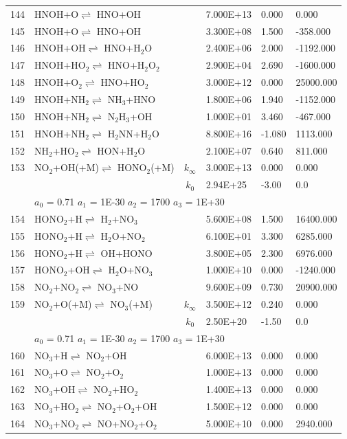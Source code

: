 \documentclass[11pt]{article}
\begin{document}
\begin{table}[hbt]
\begin{tabular}{|r l c l l l|}
144 &	HNOH+O$\rightleftharpoons$ HNO+OH&	&	7.000E+13&	0.000&	0.000\\ 
145 &	HNOH+O$\rightleftharpoons$ HNO+OH&	&	3.300E+08&	1.500&	-358.000\\ 
146 &	HNOH+OH$\rightleftharpoons$ HNO+H$_{2}$O&	&	2.400E+06&	2.000&	-1192.000\\ 
147 &	HNOH+HO$_{2}$$\rightleftharpoons$ HNO+H$_{2}$O$_{2}$&	&	2.900E+04&	2.690&	-1600.000\\ 
148 &	HNOH+O$_{2}$$\rightleftharpoons$ HNO+HO$_{2}$&	&	3.000E+12&	0.000&	25000.000\\ 
149 &	HNOH+NH$_{2}$$\rightleftharpoons$ NH$_{3}$+HNO&	&	1.800E+06&	1.940&	-1152.000\\ 
150 &	HNOH+NH$_{2}$$\rightleftharpoons$ N$_{2}$H$_{3}$+OH&	&	1.000E+01&	3.460&	-467.000\\ 
151 &	HNOH+NH$_{2}$$\rightleftharpoons$ H$_{2}$NN+H$_{2}$O&	&	8.800E+16&	-1.080&	1113.000\\ 
152 &	NH$_{2}$+HO$_{2}$$\rightleftharpoons$ HON+H$_{2}$O&	&	2.100E+07&	0.640&	811.000\\ 
153 &	NO$_{2}$+OH(+M)$\rightleftharpoons$ HONO$_{2}$(+M)&	$k_{\infty}$&	3.000E+13&	0.000&	0.000\\ 
	&	&	$k_0$&	2.94E+25&-3.00&	    0.0\\ 
	&\multicolumn{5}{l|}{	$a_0$ = 0.71	$a_1$ = 1E-30	$a_2$ = 1700	$a_3$ = 1E+30}\\ 
154 &	HONO$_{2}$+H$\rightleftharpoons$ H$_{2}$+NO$_{3}$&	&	5.600E+08&	1.500&	16400.000\\ 
155 &	HONO$_{2}$+H$\rightleftharpoons$ H$_{2}$O+NO$_{2}$&	&	6.100E+01&	3.300&	6285.000\\ 
156 &	HONO$_{2}$+H$\rightleftharpoons$ OH+HONO&	&	3.800E+05&	2.300&	6976.000\\ 
157 &	HONO$_{2}$+OH$\rightleftharpoons$ H$_{2}$O+NO$_{3}$&	&	1.000E+10&	0.000&	-1240.000\\ 
158 &	NO$_{2}$+NO$_{2}$$\rightleftharpoons$ NO$_{3}$+NO&	&	9.600E+09&	0.730&	20900.000\\ 
159 &	NO$_{2}$+O(+M)$\rightleftharpoons$ NO$_{3}$(+M)&	$k_{\infty}$&	3.500E+12&	0.240&	0.000\\ 
	&	&	$k_0$&	2.50E+20&-1.50&	    0.0\\ 
	&\multicolumn{5}{l|}{	$a_0$ = 0.71	$a_1$ = 1E-30	$a_2$ = 1700	$a_3$ = 1E+30}\\ 
160 &	NO$_{3}$+H$\rightleftharpoons$ NO$_{2}$+OH&	&	6.000E+13&	0.000&	0.000\\ 
161 &	NO$_{3}$+O$\rightleftharpoons$ NO$_{2}$+O$_{2}$&	&	1.000E+13&	0.000&	0.000\\ 
162 &	NO$_{3}$+OH$\rightleftharpoons$ NO$_{2}$+HO$_{2}$&	&	1.400E+13&	0.000&	0.000\\ 
163 &	NO$_{3}$+HO$_{2}$$\rightleftharpoons$ NO$_{2}$+O$_{2}$+OH&	&	1.500E+12&	0.000&	0.000\\ 
164 &	NO$_{3}$+NO$_{2}$$\rightleftharpoons$ NO+NO$_{2}$+O$_{2}$&	&	5.000E+10&	0.000&	2940.000\\ 
\hline
\end{tabular} 
\end{table} 
\end{document}
